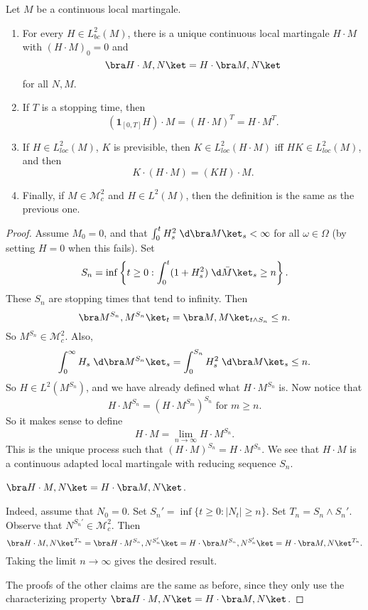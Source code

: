 \documentclass[a4paper]{article}
\begin{document}
\begin{thm}
  Let $M$ be a continuous local martingale.
  \begin{enumerate}
    \item For every $H \in L_{bc}^2(M)$, there is a unique continuous local martingale $H \cdot M$ with $(H \cdot M)_0= 0 $ and
      \[
        \bra H \cdot M, N\ket = H \cdot \bra M, N\ket
      \]
      for all $N, M$.
    \item If $T$ is a stopping time, then
      \[
        (\mathbf{1}_{[0, T]}H) \cdot M = (H \cdot M)^T = H \cdot M^T.
      \]
    \item If $H \in L^2_{loc}(M)$, $K$ is previsible, then $K \in L^2_{loc}(H \cdot M)$ iff $HK \in L^2_{loc}(M)$, and then
      \[
        K \cdot (H \cdot M) = (KH) \cdot M.
      \]
    \item Finally, if $M \in \mathcal{M}_c^2$ and $H \in L^2(M)$, then the definition is the same as the previous one.
  \end{enumerate}
\end{thm}

\begin{proof}
  Assume $M_0 = 0$, and that $\int_0^t H_s^2 \;\d \bra M\ket_s < \infty$ for all $\omega \in \Omega$ (by setting $H = 0$ when this fails). Set
  \[
    S_n = \inf \left\{ t \geq 0 : \int_0^t (1 + H_s^2) \;\d \bar M \ket_s \geq n\right\}.
  \]
  These $S_n$ are stopping times that tend to infinity. Then
  \[
    \bra M^{S_n}, M^{S_n}\ket_t = \bra M, M\ket_{t \wedge S_n} \leq n.
  \]
  So $M^{S_n} \in \mathcal{M}_c^2$. Also,
  \[
    \int_0^\infty H_s \;\d \bra M^{S_n}\ket_s = \int_0^{S_n} H_s^2 \;\d \bra M\ket_s \leq n.
  \]
  So $H \in L^2(M^{S_n})$, and we have already defined what $H \cdot M^{S_n}$ is. Now notice that
  \[
    H \cdot M^{S_n} = (H \cdot M^{S_m})^{S_n}\text{ for }m \geq n.
  \]
  So it makes sense to define
  \[
    H \cdot M = \lim_{n \to \infty} H \cdot M^{S_n}.
  \]
  This is the unique process such that $(H \cdot M)^{S_n} = H \cdot M^{S_n}$. We see that $H \cdot M$ is a continuous adapted local martingale with reducing sequence $S_n$.
  \begin{claim}
    $\bra H \cdot M, N\ket = H \cdot \bra M, N\ket$.
  \end{claim}
  Indeed, assume that $N_0 = 0$. Set $S_n' = \inf \{t \geq 0: |N_t| \geq n\}$. Set $T_n = S_n \wedge S_n'$. Observe that $N^{S_n'} \in \mathcal{M}_c^2$. Then
  \[
    \bra H \cdot M, N\ket^{T_n} = \bra H \cdot M^{S_n}, N^{S_n'}\ket = H \cdot \bra M^{S_n}, N^{S_n'}\ket = H \cdot \bra M, N\ket^{T_n}.
  \]
  Taking the limit $n \to \infty$ gives the desired result.

  The proofs of the other claims are the same as before, since they only use the characterizing property $\bra H \cdot M, N\ket = H \cdot \bra M, N\ket$.
\end{proof}
\end{document}
